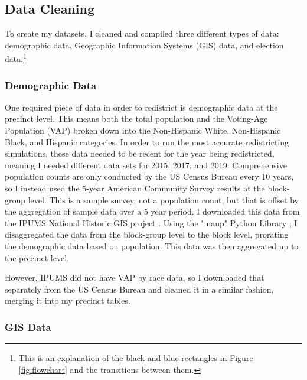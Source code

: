 \subsection{Data Cleaning}

To create my datasets, I cleaned and compiled three different types of data: demographic data, Geographic Information Systems (GIS) data, and election data.\footnote{This is an explanation of the black and blue rectangles in Figure \ref{fig:flowchart} and the transitions between them.} 

\subsubsection{Demographic Data}

One required piece of data in order to redistrict is demographic data at the precinct level. This means both the total population and the Voting-Age Population (VAP) broken down into the Non-Hispanic White, Non-Hispanic Black, and Hispanic categories. In order to run the most accurate redistricting simulations, these data needed to be recent for the year being redistricted, meaning I needed different data sets for 2015, 2017, and 2019. Comprehensive population counts are only conducted by the US Census Bureau every 10 years, so I instead used the 5-year American Community Survey results at the block-group level. This is a sample survey, not a population count, but that is offset by the aggregation of sample data over a 5 year period. I downloaded this data from the IPUMS National Historic GIS project \parencite{mansonsteven2020}. Using the "maup" Python Library \parencite{hully}, I disaggregated the data from the block-group level to the block level, prorating the demographic data based on population. This data was then aggregated up to the precinct level.

However, IPUMS did not have VAP by race data, so I downloaded that separately from the US Census Bureau \parencite{uscensusbureau} and cleaned it in a similar fashion, merging it into my precinct tables. 

\subsubsection{GIS Data}

